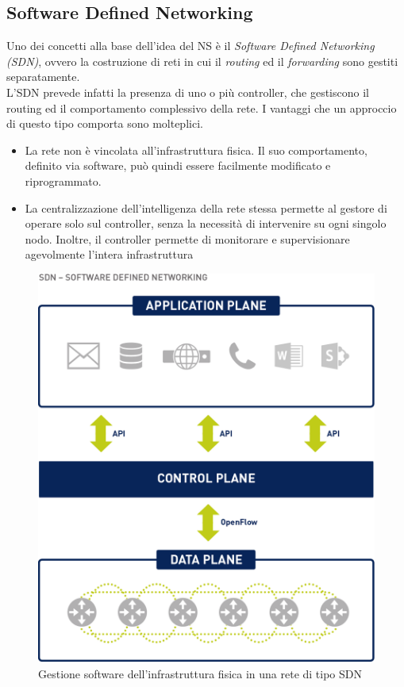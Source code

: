 \subsection{Software Defined Networking}\label{ch:1.1.1} 
Uno dei concetti alla base dell'idea del NS è il \textit{Software Defined Networking (SDN)}, ovvero la costruzione di reti in cui il \textit{routing} ed il \textit{forwarding} sono gestiti separatamente.\\
L'SDN prevede infatti la presenza di uno o più controller, che gestiscono il routing ed il comportamento complessivo della rete. I vantaggi che un approccio di questo tipo comporta sono molteplici.
\begin{itemize}
	
	\item La rete non è vincolata all'infrastruttura fisica. Il suo comportamento, definito via software, può quindi essere facilmente modificato e riprogrammato.
	
	\item La centralizzazione dell'intelligenza della rete stessa permette al gestore di operare solo sul controller, senza la necessità di intervenire su ogni singolo nodo. Inoltre, il controller permette di monitorare e supervisionare agevolmente l'intera infrastruttura \cite{6461195}	
	
\end{itemize}
\begin{figure}[h!]
	\centering
	\includegraphics[width=0.6\linewidth]{../immagini/552578-sdn-graphic-blue-910}
	\caption[Software Defined Network]{Gestione software dell'infrastruttura fisica in una rete di tipo SDN}
	\label{fig:552578-sdn-graphic-blue-910}
\end{figure}

